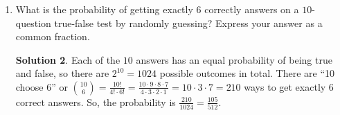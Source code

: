 \documentclass[twocolumn]{article}
\theoremstyle{definition}
\newtheorem*{solution}{Solution}
\begin{document}
\begin{enumerate}
\begin{solution}
            Another way to do this problem would be to imagine randomly 
            assigning a seat to each person one-by-one. If we assign a seat to 
            Andrew first, there will be $5$ seats left over, $2$ of which are 
            next to him. Therefore, if we randomly pick a seat for Lindsey, the 
            probability which they will be together is $\frac{2}{5}$.
        \end{solution}
    \item What is the probability of getting exactly $6$ correctly answers on a 
        $10$-question true-false test by randomly guessing? Express your answer 
        as a common fraction.
        \begin{solution}
            Each of the $10$ answers has an equal probability of being true and 
            false, so there are $2^{10} = 1024$ possible outcomes in total.  
            There are ``10 choose 6'' or $\binom{10}{6} = \frac{10!}{4! \cdot 
            6!} = \frac{10 \cdot 9 \cdot 8 \cdot 7}{4 \cdot 3 \cdot 2 \cdot 1} = 
            10 \cdot 3 \cdot 7 = 210$ ways to get exactly $6$ correct answers.  
            So, the probability is $\frac{210}{1024} = \frac{105}{512}$.
        \end{solution}
\end{enumerate}
\end{document}
